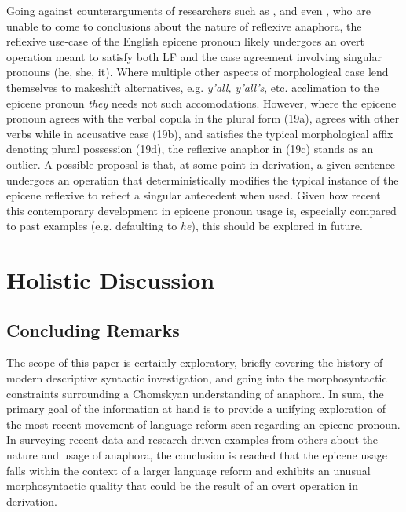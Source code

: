 \documentclass{article}
\begin{document}
Going against counterarguments of researchers such as \citet{Bick}, and even \citet{Baron}, who are unable to come to conclusions about the nature of reflexive anaphora, the reflexive use-case of the English epicene pronoun likely undergoes an overt operation meant to satisfy both LF and the case agreement involving singular pronouns (he, she, it). Where multiple other aspects of morphological case lend themselves to makeshift alternatives, e.g. \textit{y'all, y'all's}, etc. acclimation to the epicene pronoun \textit{they} needs not such accomodations. However, where the epicene pronoun agrees with the verbal copula in the plural form (19a), agrees with other verbs while in accusative case (19b), and satisfies the typical morphological affix denoting plural possession (19d), the reflexive anaphor in (19c) stands as an outlier. A possible proposal is that, at some point in derivation, a given sentence undergoes an operation that deterministically modifies the typical instance of the epicene reflexive to reflect a singular antecedent when used. Given how recent this contemporary development in epicene pronoun usage is, especially compared to past examples (e.g. defaulting to \textit{he}), this should be explored in future.

\section{Holistic Discussion}

\subsection{Concluding Remarks}
The scope of this paper is certainly exploratory, briefly covering the history of modern descriptive syntactic investigation, and going into the morphosyntactic constraints surrounding a Chomskyan understanding of anaphora. In sum, the primary goal of the information at hand is to provide a unifying exploration of the most recent movement of language reform seen regarding an epicene pronoun. In surveying recent data and research-driven examples from others about the nature and usage of anaphora, the conclusion is reached that the epicene usage falls within the context of a larger language reform and exhibits an unusual morphosyntactic quality that could be the result of an overt operation in derivation. 
\end{document}
